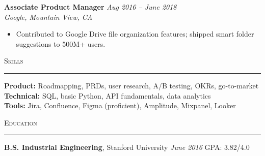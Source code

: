 \documentclass[11pt,a4paper]{article}
\newcommand{\sectionline}{\par\vspace{1pt}\noindent\rule{\textwidth}{0.4pt}\par\vspace{3pt}\noindent}
\begin{document}
\vspace{4pt}
\noindent\textbf{Associate Product Manager} \hfill \textit{Aug 2016 -- June 2018}\\
\textit{Google, Mountain View, CA}
\begin{itemize}
  \item Contributed to Google Drive file organization features; shipped smart folder suggestions to 500M+ users.
\end{itemize}

\vspace{4pt}
\noindent\textsc{Skills}
\sectionline
\textbf{Product:} Roadmapping, PRDs, user research, A/B testing, OKRs, go-to-market\\
\textbf{Technical:} SQL, basic Python, API fundamentals, data analytics\\
\textbf{Tools:} Jira, Confluence, Figma (proficient), Amplitude, Mixpanel, Looker

\vspace{4pt}
\noindent\textsc{Education}
\sectionline
\textbf{B.S. Industrial Engineering}, Stanford University \hfill \textit{June 2016} \quad GPA: 3.82/4.0
\end{document}
